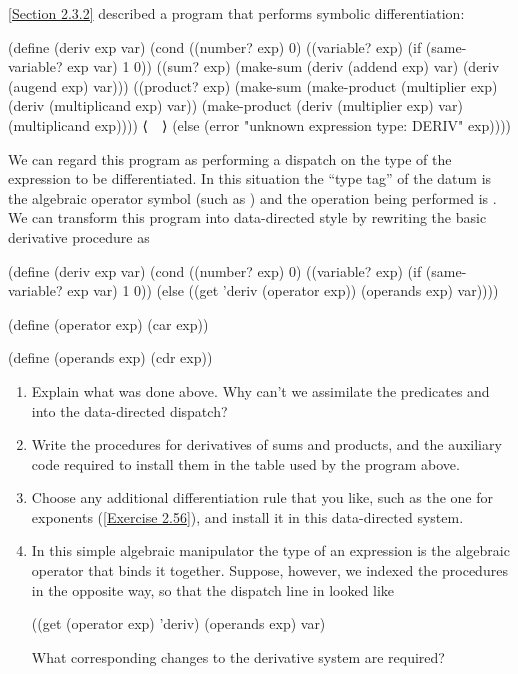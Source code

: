 \begin{exercise}
	\label{Exercise 2.73}
	\cref{Section 2.3.2} described a program that performs symbolic differentiation:
	\begin{scheme}
	  (define (deriv exp var)
	    (cond ((number? exp) 0)
	          ((variable? exp)
	           (if (same-variable? exp var) 1 0))
	          ((sum? exp)
	           (make-sum (deriv (addend exp) var)
	                     (deriv (augend exp) var)))
	          ((product? exp)
	           (make-sum (make-product
	                      (multiplier exp)
	                      (deriv (multiplicand exp) var))
	                     (make-product
	                      (deriv (multiplier exp) var)
	                      (multiplicand exp))))
	          ⟨~~⟩
	          (else (error "unknown expression type:
	                        DERIV" exp))))
	\end{scheme}
	We can regard this program as performing a dispatch on the type of the expression to be differentiated.
	In this situation the “type tag” of the datum is the algebraic operator symbol (such as \code{+}) and the operation being performed is \code{deriv}.
	We can transform this program into data-directed style by rewriting the basic derivative procedure as
	\begin{scheme}
	  (define (deriv exp var)
	    (cond ((number? exp) 0)
	          ((variable? exp) (if (same-variable? exp var) 1 0))
	          (else ((get 'deriv (operator exp))
	                 (operands exp) var))))

	  (define (operator exp) (car exp))

	  (define (operands exp) (cdr exp))
	\end{scheme}
	\begin{enumerate}[label = \alph*., leftmargin = *]

		\item
			Explain what was done above.
			Why can’t we assimilate the predicates  and  into the data-directed dispatch?

		\item
			Write the procedures for derivatives of sums and products, and the auxiliary code required to install them in the table used by the program above.

		\item
			Choose any additional differentiation rule that you like, such as the one for exponents (\cref{Exercise 2.56}), and install it in this data-directed system.

		\item
			In this simple algebraic manipulator the type of an expression is the algebraic operator that binds it together.
			Suppose, however, we indexed the procedures in the opposite way, so that the dispatch line in  looked like
			\begin{scheme}
			  ((get (operator exp) 'deriv) (operands exp) var)
			\end{scheme}
			What corresponding changes to the derivative system are required?

	\end{enumerate}
\end{exercise}
